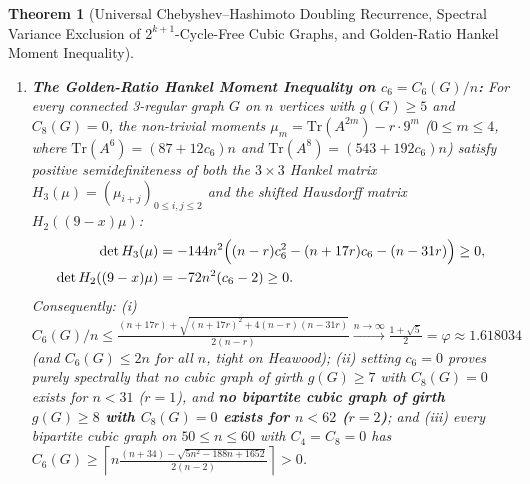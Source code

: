 \documentclass[10pt,a4paper]{article}
\newtheorem{theorem}{Theorem}[section]
\theoremstyle{definition}
\theoremstyle{remark}
\begin{document}
\begin{theorem}[Universal Chebyshev--Hashimoto Doubling Recurrence, Spectral Variance Exclusion of $2^{k+1}$-Cycle-Free Cubic Graphs, and Golden-Ratio Hankel Moment Inequality]
\begin{enumerate}[label=(\alph*),nosep]
\begin{enumerate}[label=(\roman*),nosep]
    \item \textbf{$k = 3$ ($C_4 = C_8 = 0 \implies 32 C_{16} + \mathcal{N}_{16}$ Floor):} $32 C_{16}(G) + \mathcal{N}_{16}(G) = \mathrm{Tr}(B^{16}) \ge \frac{6n(11{,}179 r - 85n)}{n - r} > 0$ for every $n \le 131$ ($r = 1$) and every $n \le 263$ ($r = 2$). Consequently, \textbf{every} cubic graph of girth $g(G) \ge 9$ on $n \le 130$ vertices has $C_{16}(G) \ge \lceil \frac{3n(11{,}179 - 85n)}{16(n - 1)} \rceil > 0$, \textbf{every} bipartite cubic graph of girth $g(G) \ge 10$ on $n \le 262$ vertices has $C_{16}(G) \ge \lceil \frac{3n(22{,}358 - 85n)}{16(n - 2)} \rceil > 0$, and on $50 \le n \le 64$, every bipartite $C_4 = C_8 = 0$ graph has $\mathrm{Tr}(B^{16})/32 \ge \lceil \frac{3n(22{,}358 - 85n)}{16(n - 2)} \rceil \in [3275, 3537]$ (Figure~\ref{fig:phase3}(b));
    \item \textbf{$k = 4$ ($C_4 = C_8 = C_{16} = 0, g \ge 9 \implies C_{32}$ Floor):} $\mathrm{Tr}(B^{32}) \ge \frac{6n(715{,}893{,}419 r - 21{,}845 n)}{n - r} > 0$ for all $n \le 32{,}771 r$.
  \end{enumerate}
  \item \textbf{The Golden-Ratio Hankel Moment Inequality on $c_6 = C_6(G)/n$:} For every connected 3-regular graph $G$ on $n$ vertices with $g(G) \ge 5$ and $C_8(G) = 0$, the non-trivial moments $\mu_m = \mathrm{Tr}(A^{2m}) - r \cdot 9^m$ ($0 \le m \le 4$, where $\mathrm{Tr}(A^6) = (87 + 12 c_6)n$ and $\mathrm{Tr}(A^8) = (543 + 192 c_6)n$) satisfy positive semidefiniteness of both the $3 \times 3$ Hankel matrix $H_3(\mu) = (\mu_{i+j})_{0 \le i,j \le 2}$ and the shifted Hausdorff matrix $H_2((9-x)\mu)$:
  \begin{equation}\label{eq:hankel}
  \begin{aligned}
    \det H_3(\mu) &= -144 n^2 \Bigl((n - r) c_6^2 - (n + 17 r) c_6 - (n - 31 r)\Bigr) \ge 0, \\
    \det H_2((9-x)\mu) &= -72 n^2 (c_6 - 2) \ge 0.
  \end{aligned}
  \end{equation}
  Consequently: (i) $C_6(G)/n \le \frac{(n+17r) + \sqrt{(n+17r)^2 + 4(n-r)(n-31r)}}{2(n-r)} \xrightarrow{n \to \infty} \frac{1+\sqrt{5}}{2} = \varphi \approx 1.618034$ (and $C_6(G) \le 2n$ for all $n$, tight on Heawood); (ii) setting $c_6 = 0$ proves purely spectrally that no cubic graph of girth $g(G) \ge 7$ with $C_8(G) = 0$ exists for $n < 31$ ($r = 1$), and \textbf{no bipartite cubic graph of girth $g(G) \ge 8$ with $C_8(G) = 0$ exists for $n < 62$ ($r = 2$)}; and (iii) every bipartite cubic graph on $50 \le n \le 60$ with $C_4 = C_8 = 0$ has $C_6(G) \ge \left\lceil n \frac{(n+34) - \sqrt{5n^2 - 188n + 1652}}{2(n-2)} \right\rceil > 0$.
\end{enumerate}
\end{theorem}
\end{document}
